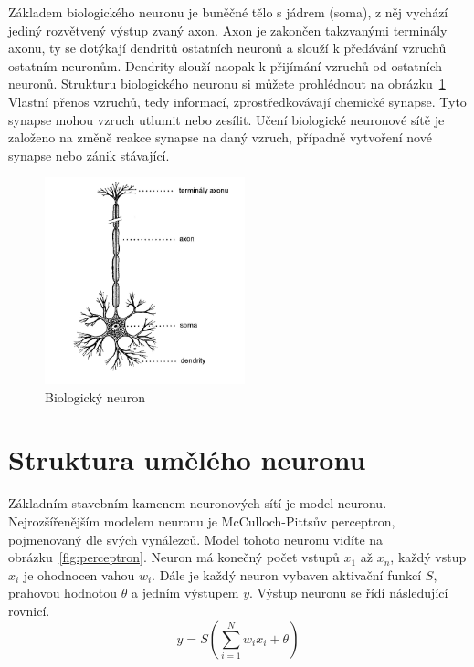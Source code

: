 \documentclass[11pt,twoside,a4paper]{book}
\begin{document}
Základem biologického neuronu je buněčné tělo s jádrem (soma), z něj vychází jediný rozvětvený výstup zvaný axon. Axon je zakončen takzvanými terminály axonu, ty se dotýkají dendritů ostatních neuronů a slouží k předávání vzruchů ostatním neuronům. Dendrity slouží naopak k přijímání vzruchů od ostatních neuronů. Strukturu biologického neuronu si můžete prohlédnout na obrázku~\ref{fig:bioneuron} Vlastní přenos vzruchů, tedy informací, zprostředkovávají chemické synapse. Tyto synapse mohou vzruch utlumit nebo zesílit. Učení biologické neuronové sítě je založeno na změně reakce synapse na daný vzruch, případně vytvoření nové synapse nebo zánik stávající.

\begin{figure}[!h]
\begin{center}
\includegraphics[height=6cm]{figures/bioneuron.png}
\caption{Biologický neuron\cite{teoret}}
\label{fig:bioneuron}
\end{center}
\end{figure}

\section{Struktura umělého neuronu}
Základním stavebním kamenem neuronových sítí je model neuronu. Nejrozšířenějším modelem neuronu je McCulloch-Pittsův perceptron, pojmenovaný dle svých vynálezců.  Model tohoto neuronu vidíte na obrázku~\ref{fig:perceptron}. Neuron má konečný počet vstupů \begin{math} x_{1}\end{math} až \begin{math}x_{n}\end{math}, každý vstup \begin{math} x_{i}\end{math} je ohodnocen vahou \begin{math} w_{i}\end{math}. Dále je každý neuron vybaven aktivační funkcí \begin{math}S\end{math}, prahovou hodnotou \begin{math}\theta\end{math} a jedním výstupem \begin{math} y\end{math}. Výstup neuronu se řídí následující rovnicí.
\begin{equation}
  y=S(\sum\limits_{i=1}^N w_{i}x_{i} + \theta)
\end{equation}
\end{document}
